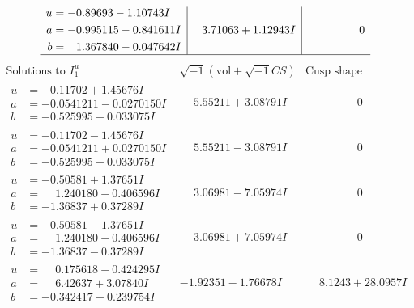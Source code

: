 \documentclass[1p]{elsarticle_modified}
\theoremstyle{definition}
\newcommand{\I}{\sqrt{-1}}
\begin{document}
$$\begin{array}{c|c|c}
\begin{aligned}
u &= -0.89693 - 1.10743 I \\
a &= -0.995115 - 0.841611 I \\
b &= \phantom{-}1.367840 - 0.047642 I\end{aligned}
 & \phantom{-}3.71063 + 1.12943 I & \phantom{-0.000000 } 0\\
 \hline 
 \end{array}$$\newpage$$\begin{array}{c|c|c}  
\text{Solutions to }I^u_{1}& \I (\text{vol} + \sqrt{-1}CS) & \text{Cusp shape}\\
 \hline 
\begin{aligned}
u &= -0.11702 + 1.45676 I \\
a &= -0.0541211 - 0.0270150 I \\
b &= -0.525995 + 0.033075 I\end{aligned}
 & \phantom{-}5.55211 + 3.08791 I & \phantom{-0.000000 } 0 \\ \hline\begin{aligned}
u &= -0.11702 - 1.45676 I \\
a &= -0.0541211 + 0.0270150 I \\
b &= -0.525995 - 0.033075 I\end{aligned}
 & \phantom{-}5.55211 - 3.08791 I & \phantom{-0.000000 } 0 \\ \hline\begin{aligned}
u &= -0.50581 + 1.37651 I \\
a &= \phantom{-}1.240180 - 0.406596 I \\
b &= -1.36837 + 0.37289 I\end{aligned}
 & \phantom{-}3.06981 - 7.05974 I & \phantom{-0.000000 } 0 \\ \hline\begin{aligned}
u &= -0.50581 - 1.37651 I \\
a &= \phantom{-}1.240180 + 0.406596 I \\
b &= -1.36837 - 0.37289 I\end{aligned}
 & \phantom{-}3.06981 + 7.05974 I & \phantom{-0.000000 } 0 \\ \hline\begin{aligned}
u &= \phantom{-}0.175618 + 0.424295 I \\
a &= \phantom{-}6.42637 + 3.07840 I \\
b &= -0.342417 + 0.239754 I\end{aligned}
 & -1.92351 - 1.76678 I & \phantom{-}8.1243 + 28.0957 I \\ \hline\begin{aligned}

\end{aligned}
\end{array}$$
\end{document}
